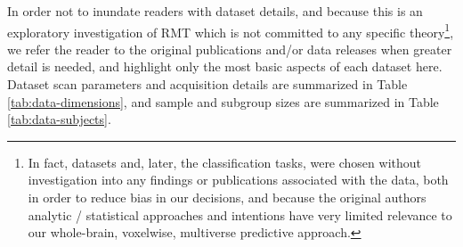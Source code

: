 \documentclass[12pt]{spieman}  %
\begin{document}
\begin{spacing}{2}
In order not to inundate readers with dataset details, and because this is an
exploratory investigation of RMT which is not committed to any specific
theory\footnote{In fact, datasets and, later, the classification tasks, were
chosen without investigation into any findings or publications associated with
the data, both in order to reduce bias in our decisions, and because the
original authors analytic / statistical approaches and intentions have very
limited relevance to our whole-brain, voxelwise, multiverse predictive
approach.}, we refer the reader to the original publications and/or data
releases when greater detail is needed, and highlight only the most basic
aspects of each dataset here.  Dataset scan parameters and acquisition details
are summarized in Table \ref{tab:data-dimensions}, and sample and subgroup
sizes are summarized in Table \ref{tab:data-subjects}.


\end{spacing}
\end{document}
